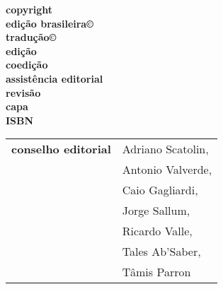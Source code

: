 \newcommand{\linha}[2]{\ifdef{#2}{\linhalayout{#1}{#2}}{}}

\begingroup\tiny
\parindent=0cm
\thispagestyle{empty}

\textbf{copyright}\\
\textbf{edição brasileira©}\\
\textbf{tradução©}\\


\textbf{edição}\\
\textbf{coedição}\\
\textbf{assistência editorial}\\
\textbf{revisão}\\
\textbf{capa}\\

\textbf{ISBN}\smallskip

\hspace{-5pt}\begin{tabular}{ll}
\textbf{conselho editorial} & Adriano Scatolin,  \\
							& Antonio Valverde,  \\
							& Caio Gagliardi,    \\
							& Jorge Sallum,      \\
							& Ricardo Valle,     \\
							& Tales Ab'Saber,    \\
							& Tâmis Parron      
\end{tabular}
 

